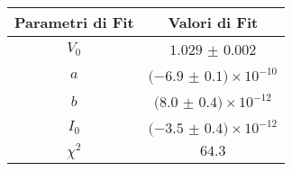 \begin{tabular}{cc}
\hline
	Parametri di Fit & Valori di Fit\\ 
\hline
	$V_0$ & $1.029$ $\pm$ $0.002$ \\
	$a$ & $(-6.9$ $\pm$ $0.1)\times 10^{-10}$ \\
	$b$ & $(8.0$ $\pm$ $0.4)\times 10^{-12}$ \\
	$I_0$ & $(-3.5$ $\pm$ $0.4)\times 10^{-12}$ \\
	$\chi^2$ & $64.3$ \\
\hline
\end{tabular}
